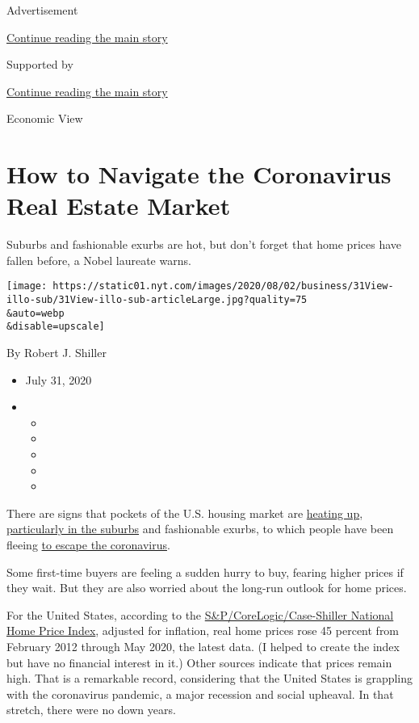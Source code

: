 Advertisement

\protect\hyperlink{after-top}{Continue reading the main story}

Supported by

\protect\hyperlink{after-sponsor}{Continue reading the main story}

Economic View

\hypertarget{how-to-navigate-the-coronavirus-real-estate-market}{%
\section{How to Navigate the Coronavirus Real Estate
Market}\label{how-to-navigate-the-coronavirus-real-estate-market}}

Suburbs and fashionable exurbs are hot, but don't forget that home
prices have fallen before, a Nobel laureate warns.

\texttt{[image: https://static01.nyt.com/images/2020/08/02/business/31View-illo-sub/31View-illo-sub-articleLarge.jpg?quality=75\\\&auto=webp\\\&disable=upscale]}

By Robert J. Shiller

\begin{itemize}
\item
  July 31, 2020
\item
  \begin{itemize}
  \item
  \item
  \item
  \item
  \item
  \end{itemize}
\end{itemize}

There are signs that pockets of the U.S. housing market are
\href{https://www.nar.realtor/newsroom/existing-home-sales-climb-record-20-7-in-june}{heating
up},
\href{https://www.realtor.com/research/housing-market-rankings-in-suburban-communities-outpaced-urban-areas-in-may/}{particularly
in the suburbs} and fashionable exurbs, to which people have been
fleeing
\href{https://www.nytimes.com/2020/05/08/realestate/coronavirus-escape-city-to-suburbs.html}{to
escape the coronavirus}.

Some first-time buyers are feeling a sudden hurry to buy, fearing higher
prices if they wait. But they are also worried about the long-run
outlook for home prices.

For the United States, according to the
\href{https://www.spglobal.com/spdji/en/indices/indicators/sp-corelogic-case-shiller-us-national-home-price-nsa-index/\#data}{S\&P/CoreLogic/Case-Shiller
National Home Price Index}, adjusted for inflation, real home prices
rose 45 percent from February 2012 through May 2020, the latest data. (I
helped to create the index but have no financial interest in it.) Other
sources indicate that prices remain high. That is a remarkable record,
considering that the United States is grappling with the coronavirus
pandemic, a major recession and social upheaval. In that stretch, there
were no down years.

